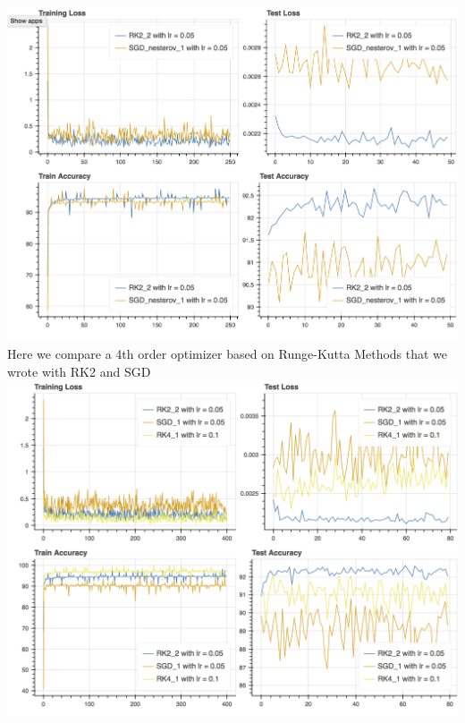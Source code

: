 \includegraphics[scale=0.4]{plots/lasso_2.png}
\\
Here we compare a 4th order optimizer based on Runge-Kutta Methods that we wrote with RK2 and SGD
\\
\includegraphics[scale=0.4]{plots/lasso_1.png}
\\

